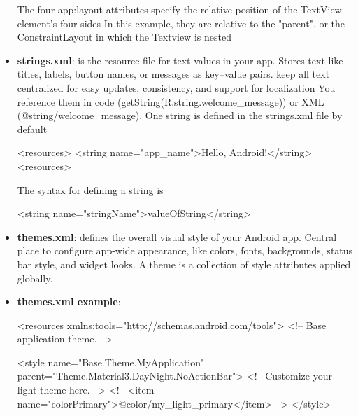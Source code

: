 \documentclass{report}
\begin{document}
\begin{itemize}
            \bigbreak \noindent 
            The four app:layout attributes specify the relative position of the TextView element's four sides
            \bigbreak \noindent 
            In this example, they are relative to the "parent", or the ConstraintLayout in which the Textview is nested
        \item \textbf{strings.xml}: is the resource file for text values in your app. Stores text like titles, labels, button names, or messages as key–value pairs.
            keep all text centralized for easy updates, consistency, and support for localization
            \bigbreak \noindent 
            You reference them in code (getString(R.string.welcome\_message)) or XML (@string/welcome\_message).
            \bigbreak \noindent 
            One string is defined in the strings.xml file by default
            \bigbreak \noindent 
            \begin{xmlcode}
                <resources>
                    <string name="app_name">Hello, Android!</string>
                <resources>
            \end{xmlcode}
            \bigbreak \noindent 
            The syntax for defining a string is
            \bigbreak \noindent 
            \begin{xmlcode}
                <string name="stringName">valueOfString</string>
            \end{xmlcode}
        \item \textbf{themes.xml}: defines the overall visual style of your Android app.
            \bigbreak \noindent 
            Central place to configure app-wide appearance, like colors, fonts, backgrounds, status bar style, and widget looks.
            \bigbreak \noindent 
            A theme is a collection of style attributes applied globally.
        \item \textbf{themes.xml example}:
            \bigbreak \noindent 
            \begin{xmlcode}
             <resources xmlns:tools="http://schemas.android.com/tools">
                 <!-- Base application theme. -->

                 <style name="Base.Theme.MyApplication" parent="Theme.Material3.DayNight.NoActionBar">
                     <!-- Customize your light theme here. -->
                     <!-- <item name="colorPrimary">@color/my_light_primary</item> -->
                 </style>


\end{xmlcode}
\end{itemize}
\end{document}
